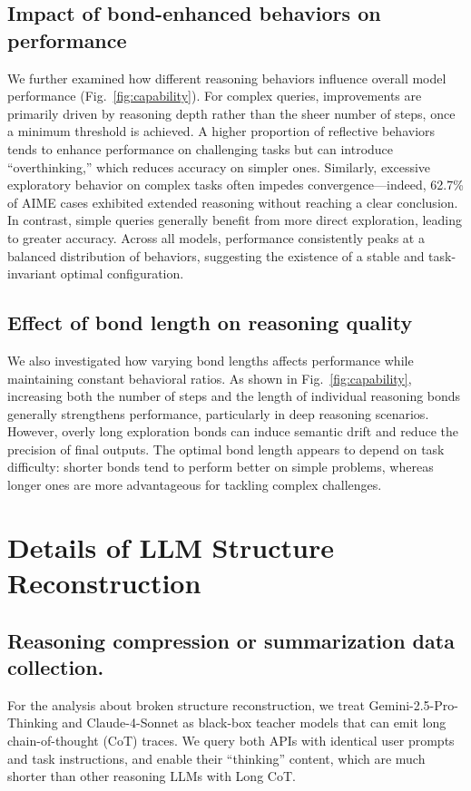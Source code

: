 \subsection{Impact of bond-enhanced behaviors on performance}

We further examined how different reasoning behaviors influence overall model performance (Fig.~\ref{fig:capability}). For complex queries, improvements are primarily driven by reasoning depth rather than the sheer number of steps, once a minimum threshold is achieved. A higher proportion of reflective behaviors tends to enhance performance on challenging tasks but can introduce “overthinking,” which reduces accuracy on simpler ones. Similarly, excessive exploratory behavior on complex tasks often impedes convergence—indeed, 62.7\% of AIME cases exhibited extended reasoning without reaching a clear conclusion. In contrast, simple queries generally benefit from more direct exploration, leading to greater accuracy. Across all models, performance consistently peaks at a balanced distribution of behaviors, suggesting the existence of a stable and task-invariant optimal configuration.

\subsection{Effect of bond length on reasoning quality}

We also investigated how varying bond lengths affects performance while maintaining constant behavioral ratios. As shown in Fig.~\ref{fig:capability}, increasing both the number of steps and the length of individual reasoning bonds generally strengthens performance, particularly in deep reasoning scenarios. However, overly long exploration bonds can induce semantic drift and reduce the precision of final outputs. The optimal bond length appears to depend on task difficulty: shorter bonds tend to perform better on simple problems, whereas longer ones are more advantageous for tackling complex challenges.



\section{Details of LLM Structure Reconstruction}
\label{app:exp_settings}



\subsection{Reasoning compression or summarization data collection.}
For the analysis about broken structure reconstruction, we treat Gemini-2.5-Pro-Thinking and Claude-4-Sonnet as black-box teacher models that can emit long chain-of-thought (CoT) traces. 
We query both APIs with identical user prompts and task instructions, and enable their ``thinking'' content, which are much shorter than other reasoning LLMs with Long CoT.\vspace{-5pt}



